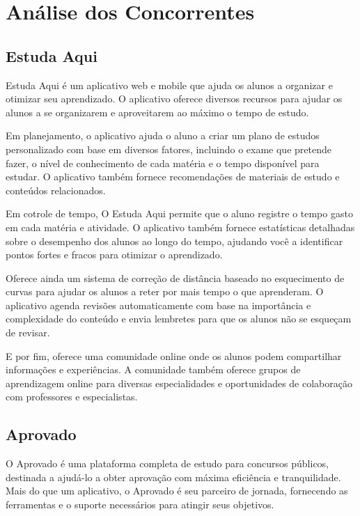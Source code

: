 \section{Análise dos Concorrentes}

\subsection{Estuda Aqui}

Estuda Aqui é um aplicativo web e mobile que ajuda os alunos a organizar e otimizar seu aprendizado. O aplicativo oferece diversos recursos para ajudar os alunos a se organizarem e aproveitarem ao máximo o tempo de estudo.


Em planejamento, o aplicativo  ajuda o aluno a criar um plano de estudos personalizado com base em diversos fatores, incluindo o exame que pretende fazer, o nível de conhecimento de cada matéria e o tempo disponível para estudar. O aplicativo também fornece recomendações de materiais de estudo e conteúdos relacionados. 

Em cotrole de tempo, O Estuda Aqui permite que o aluno registre o tempo gasto em cada matéria e atividade. O aplicativo também fornece estatísticas detalhadas sobre o desempenho dos alunos ao longo do tempo, ajudando você a identificar pontos fortes e fracos para otimizar o aprendizado. 

Oferece ainda um sistema de correção de distância baseado no esquecimento de curvas para ajudar os alunos a reter por mais tempo o que aprenderam. O aplicativo agenda revisões automaticamente com base na importância e complexidade do conteúdo e envia lembretes para que os alunos não se esqueçam de revisar. 

E por fim, oferece uma comunidade online onde os alunos podem compartilhar informações e experiências. A comunidade também oferece grupos de aprendizagem online para diversas especialidades e oportunidades de colaboração com professores e especialistas.

\subsection{Aprovado}

O Aprovado é uma plataforma completa de estudo para concursos públicos, destinada a ajudá-lo a obter aprovação com máxima eficiência e tranquilidade. Mais do que um aplicativo, o Aprovado é seu parceiro de jornada, fornecendo as ferramentas e o suporte necessários para atingir seus objetivos.

